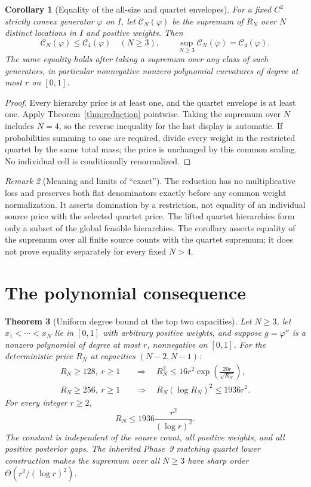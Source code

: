 \documentclass[11pt]{article}
\newtheorem{theorem}{Theorem}
\newtheorem{corollary}[theorem]{Corollary}
\theoremstyle{remark}\newtheorem{remark}[theorem]{Remark}
\begin{document}
\begin{corollary}[Equality of the all-size and quartet envelopes]
\label{cor:envelope}
For a fixed $C^2$ strictly convex generator $\varphi$ on $I$, let
$\mathcal C_N(\varphi)$ be the supremum of $R_N$ over $N$ distinct
locations in $I$ and positive weights. Then
\[
 \mathcal C_N(\varphi)\le\mathcal C_4(\varphi)\quad(N\ge3),
 \qquad
 \sup_{N\ge3}\mathcal C_N(\varphi)=\mathcal C_4(\varphi).
\]
The same equality holds after taking a supremum over any class of such
generators, in particular nonnegative nonzero polynomial curvatures of
degree at most $r$ on $[0,1]$.
\end{corollary}

\begin{proof}
Every hierarchy price is at least one, and the quartet envelope is at
least one. Apply Theorem~\ref{thm:reduction} pointwise. Taking the
supremum over $N$ includes $N=4$, so the reverse inequality for the last
display is automatic. If probabilities summing to one are required,
divide every weight in the restricted quartet by the same total mass;
the price is unchanged by this common scaling. No individual cell is
conditionally renormalized.
\end{proof}

\begin{remark}[Meaning and limits of ``exact'']
The reduction has no multiplicative loss and preserves both flat
denominators exactly before any common weight normalization. It asserts
domination by a restriction, not equality of an individual source price
with the selected quartet price. The lifted quartet hierarchies form
only a subset of the global feasible hierarchies. The corollary asserts
equality of the supremum over all finite source counts with the quartet
supremum; it does not prove equality separately for every fixed $N>4$.
\end{remark}

\section{The polynomial consequence}

\begin{theorem}[Uniform degree bound at the top two capacities]
\label{thm:degree}
Let $N\ge3$, let $x_1<\cdots<x_N$ lie in $[0,1]$ with arbitrary positive
weights, and suppose $g=\varphi''$ is a nonzero polynomial of degree at
most $r$, nonnegative on $[0,1]$. For the deterministic price $R_N$ at
capacities $(N-2,N-1)$:
\begin{align*}
 R_N\ge128,\ r\ge1
 &\quad\Longrightarrow\quad
 R_N^2\le16r^2\exp\left(\frac{20r}{\sqrt{R_N}}\right),\\
 R_N\ge256,\ r\ge1
 &\quad\Longrightarrow\quad
 R_N(\log R_N)^2\le1936r^2.
\end{align*}
For every integer $r\ge2$,
\[
 \boxed{\displaystyle R_N\le1936\frac{r^2}{(\log r)^2}.}
\]
The constant is independent of the source count, all positive weights,
and all positive posterior gaps. The inherited Phase~9 matching quartet
lower construction makes the supremum over all $N\ge3$ have sharp order
$\Theta(r^2/(\log r)^2)$.
\end{theorem}
\end{document}

